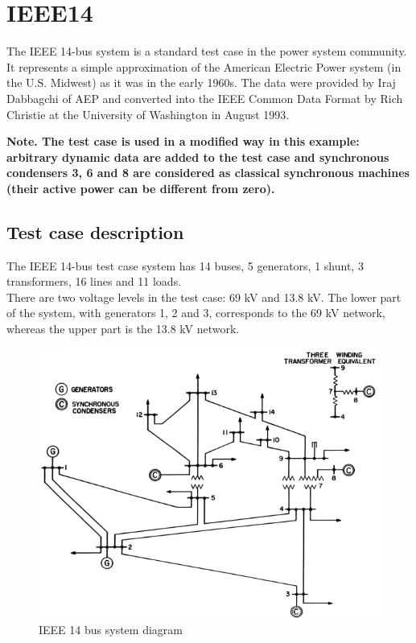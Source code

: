 \documentclass[a4paper, 12pt]{report}
\begin{document}
\chapter{IEEE14}

The IEEE 14-bus system is a standard test case in the power system community. It represents a simple approximation of the American Electric Power system (in the U.S. Midwest) as it was in the early 1960s. The data were provided by Iraj Dabbagchi of AEP and converted into the IEEE Common Data Format by Rich Christie at the University of Washington in August 1993.

\textbf{Note. The test case is used in a modified way in this example: arbitrary dynamic data are added to the test case and synchronous condensers 3, 6 and 8 are considered as classical synchronous machines (their active power can be different from zero).}

\section{Test case description}

The IEEE 14-bus test case system has 14 buses, 5 generators, 1 shunt, 3 transformers, 16 lines and 11 loads.\\
There are two voltage levels in the test case: 69 kV and 13.8 kV. The lower part of the system, with generators 1, 2 and 3, corresponds to the 69 kV network, whereas the upper part is the 13.8 kV network.

\begin{figure}[H]
  \includegraphics[width=\textwidth]{Single-line-diagram-of-IEEE-14-bus-system.png}
  \caption{IEEE 14 bus system diagram}
\end{figure}
\end{document}
